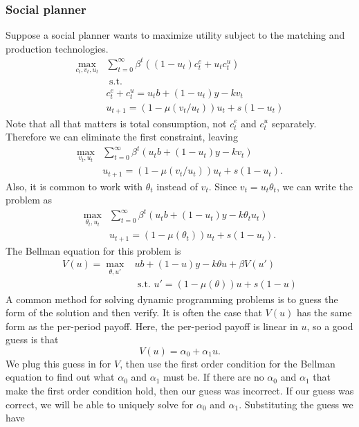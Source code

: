 \documentclass[12pt,reqno]{amsart}
\theoremstyle{definition}
\begin{document}
\subsubsection{Social planner}

Suppose a social planner wants to maximize utility subject to the
matching and production technologies. 
\begin{align*}
  \max_{c_t,v_t,u_t} & \sum_{t=0}^\infty \beta^t \left( (1-u_t)c_t^e + u_t
    c_t^u\right) \\
  & \text{ s.t.} \\
  & c_t^e + c_t^u = u_t b + (1-u_t) y - k v_t \\
  & u_{t+1} = (1-\mu(v_t/u_t)) u_t + s (1-u_t) 
\end{align*}
Note that all that matters is total consumption, not $c_t^e$ and
$c_t^u$ separately. Therefore we can eliminate the first constraint, leaving
\begin{align*}
  \max_{v_t,u_t} & \sum_{t=0}^\infty \beta^t \left(u_t b + (1-u_t)
    y - k v_t\right) \\ 
  & u_{t+1} = (1-\mu(v_t/u_t)) u_t + s (1-u_t).
\end{align*}
Also, it is common to work with $\theta_t$ instead of $v_t$. Since
$v_t = u_t \theta_t$, we can write the problem as
\begin{align*}
  \max_{\theta_t,u_t} & \sum_{t=0}^\infty \beta^t \left(u_t b + (1-u_t)
    y - k \theta_t u_t\right) \\ 
  & u_{t+1} = (1-\mu(\theta_t)) u_t + s (1-u_t).
\end{align*}
The Bellman equation for this problem is
\begin{align*}
  V(u) = \max_{\theta,u'} & u b + (1-u) y - k \theta u + \beta V(u') \\
  & \text{ s.t. } u' = (1-\mu(\theta)) u + s(1-u)
\end{align*}
A common method for solving dynamic programming problems is to guess
the form of the solution and then verify. It is often the case that
$V(u)$ has the same form as the per-period payoff. Here, the
per-period payoff is linear in $u$, so a good guess is that 
\[ V(u) = \alpha_0 + \alpha_1 u. \]
We plug this guess in for $V$, then use the first order condition for
the Bellman equation to find out what $\alpha_0$ and $\alpha_1$ must
be. If there are no $\alpha_0$ and $\alpha_1$ that make the first
order condition hold, then our guess was incorrect. If our guess was
correct, we will be able to uniquely solve for $\alpha_0$ and
$\alpha_1$. Substituting the guess we have
\end{document}
